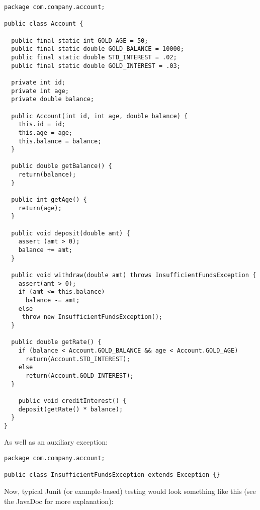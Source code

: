 \documentclass{article}
\begin{document}
\begin{lstlisting}
package com.company.account;

public class Account {
  
  public final static int GOLD_AGE = 50;
  public final static double GOLD_BALANCE = 10000;
  public final static double STD_INTEREST = .02;
  public final static double GOLD_INTEREST = .03;
  
  private int id;
  private int age;
  private double balance;
  
  public Account(int id, int age, double balance) {
    this.id = id;
    this.age = age;
    this.balance = balance;
  }
  
  public double getBalance() {
    return(balance);
  }
  
  public int getAge() {
    return(age);
  }
  
  public void deposit(double amt) {
    assert (amt > 0);
    balance += amt;
  }
  
  public void withdraw(double amt) throws InsufficientFundsException {
    assert(amt > 0);
    if (amt <= this.balance) 
      balance -= amt;
    else 
     throw new InsufficientFundsException();
  }

  public double getRate() {
    if (balance < Account.GOLD_BALANCE && age < Account.GOLD_AGE) 
      return(Account.STD_INTEREST);
    else 
      return(Account.GOLD_INTEREST);
  }

    public void creditInterest() {
    deposit(getRate() * balance);
  }
}
\end{lstlisting}

As well as an auxiliary exception:

\begin{lstlisting}
package com.company.account;

public class InsufficientFundsException extends Exception {}
\end{lstlisting}

Now, typical Junit (or example-based) testing would look something like
this (see the JavaDoc for more explanation):
\end{document}
